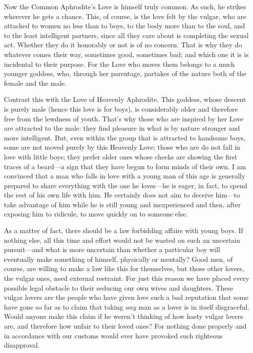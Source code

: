  Now the Common Aphrodite's Love is himself truly common. As
such, he strikes wherever he gets a chance. This, of course, is the love
felt by the vulgar, who are attached to women no less than to boys, to
the body more than to the soul, and to the least intelligent partners,
since all they care about is completing the sexual act. Whether they do
it honorably or not is of no concern. That is why they do whatever comes
their way, sometimes good, sometimes bad; and which one it is is
incidental to their purpose. For the Love who moves them belongs to a
much younger goddess,  who, through her parentage, partakes of
the nature both of the female and the male.

Contrast this with the Love of Heavenly Aphrodite. This goddess, whose
descent is purely male (hence this love is for boys), is considerably
older and therefore free from the lewdness of youth. That's why those
who are inspired by her Love are attracted to the male: they find
pleasure in what is by nature stronger and more intelligent. But, even
within the group that  is attracted to handsome boys, some are
not moved purely by this Heavenly Love; those who are do not fall in
love with little boys; they prefer older ones whose cheeks are showing
the first traces of a beard---a sign that they have begun to form minds
of their own. I am convinced that a man who falls in love with a young
man of this age is generally prepared to share everything with the one
he loves---he is eager, in fact, to spend the rest of his own life with
him. He certainly does not aim to deceive him---to take advantage of him
while he is still young and inexperienced and  then, after
exposing him to ridicule, to move quickly on to someone else.

As a matter of fact, there should be a law forbidding affairs with young
boys. If nothing else, all this time and effort would not be wasted on
such an uncertain pursuit---and what is more uncertain than whether a
particular boy will eventually make something of himself, physically or
mentally? Good men, of course, are willing to make a law like this for
themselves, but those other lovers, the vulgar ones, need external
restraint.  For just this reason we have placed every
possible legal obstacle to their seducing our own wives and daughters.
These vulgar lovers are the people who have given love such a bad
reputation that some have gone so far as to claim that taking {\em any}
man as a lover is in itself disgraceful. Would anyone make this claim if
he weren't thinking of how hasty vulgar lovers are, and therefore how
unfair to their loved ones? For nothing done properly and in accordance
with our customs would ever have provoked such righteous disapproval.

